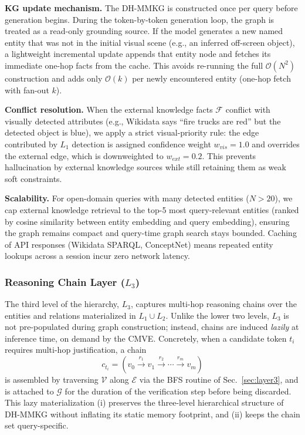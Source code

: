 \noindent\textbf{KG update mechanism.} The DH-MMKG is constructed once per query before generation begins. During the token-by-token generation loop, the graph is treated as a read-only grounding source. If the model generates a new named entity that was not in the initial visual scene (e.g., an inferred off-screen object), a lightweight incremental update appends that entity node and fetches its immediate one-hop facts from the cache. This avoids re-running the full $\mathcal{O}(N^2)$ construction and adds only $\mathcal{O}(k)$ per newly encountered entity (one-hop fetch with fan-out $k$).

\noindent\textbf{Conflict resolution.} When the external knowledge facts $\mathcal{F}$ conflict with visually detected attributes (e.g., Wikidata says ``fire trucks are red'' but the detected object is blue), we apply a strict visual-priority rule: the edge contributed by $L_1$ detection is assigned confidence weight $w_{vis} = 1.0$ and overrides the external edge, which is downweighted to $w_{ext} = 0.2$. This prevents hallucination by external knowledge sources while still retaining them as weak soft constraints.

\noindent\textbf{Scalability.} For open-domain queries with many detected entities ($N > 20$), we cap external knowledge retrieval to the top-5 most query-relevant entities (ranked by cosine similarity between entity embedding and query embedding), ensuring the graph remains compact and query-time graph search stays bounded. Caching of API responses (Wikidata SPARQL, ConceptNet) means repeated entity lookups across a session incur zero network latency.

\subsubsection{Reasoning Chain Layer ($L_3$)}
\label{sec:l3}
The third level of the hierarchy, $L_3$, captures multi-hop reasoning chains over the entities and relations materialized in $L_1 \cup L_2$. Unlike the lower two levels, $L_3$ is not pre-populated during graph construction; instead, chains are induced \emph{lazily} at inference time, on demand by the CMVE. Concretely, when a candidate token $t_i$ requires multi-hop justification, a chain
\begin{equation}
c_{t_i} = (v_0 \xrightarrow{r_1} v_1 \xrightarrow{r_2} \cdots \xrightarrow{r_m} v_m)
\end{equation}
is assembled by traversing $\mathcal{V}$ along $\mathcal{E}$ via the BFS routine of Sec.~\ref{sec:layer3}, and is attached to $\mathcal{G}$ for the duration of the verification step before being discarded. This lazy materialization (i) preserves the three-level hierarchical structure of DH-MMKG without inflating its static memory footprint, and (ii) keeps the chain set query-specific.

